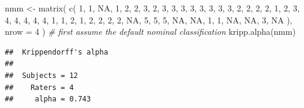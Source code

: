 \documentclass[
]{book}
\newenvironment{Shaded}{\begin{snugshade}}{\end{snugshade}}
\newcommand{\AttributeTok}[1]{\textcolor[rgb]{0.77,0.63,0.00}{#1}}
\newcommand{\CommentTok}[1]{\textcolor[rgb]{0.56,0.35,0.01}{\textit{#1}}}
\newcommand{\ConstantTok}[1]{\textcolor[rgb]{0.00,0.00,0.00}{#1}}
\newcommand{\DecValTok}[1]{\textcolor[rgb]{0.00,0.00,0.81}{#1}}
\newcommand{\FunctionTok}[1]{\textcolor[rgb]{0.00,0.00,0.00}{#1}}
\newcommand{\NormalTok}[1]{#1}
\newcommand{\OtherTok}[1]{\textcolor[rgb]{0.56,0.35,0.01}{#1}}
\begin{document}
\begin{Shaded}
\begin{Highlighting}[]
\NormalTok{nmm }\OtherTok{\textless{}{-}}
    \FunctionTok{matrix}\NormalTok{(}
        \FunctionTok{c}\NormalTok{(}
            \DecValTok{1}\NormalTok{,}
            \DecValTok{1}\NormalTok{,}
            \ConstantTok{NA}\NormalTok{,}
            \DecValTok{1}\NormalTok{,}
            \DecValTok{2}\NormalTok{,}
            \DecValTok{2}\NormalTok{,}
            \DecValTok{3}\NormalTok{,}
            \DecValTok{2}\NormalTok{,}
            \DecValTok{3}\NormalTok{,}
            \DecValTok{3}\NormalTok{,}
            \DecValTok{3}\NormalTok{,}
            \DecValTok{3}\NormalTok{,}
            \DecValTok{3}\NormalTok{,}
            \DecValTok{3}\NormalTok{,}
            \DecValTok{3}\NormalTok{,}
            \DecValTok{3}\NormalTok{,}
            \DecValTok{2}\NormalTok{,}
            \DecValTok{2}\NormalTok{,}
            \DecValTok{2}\NormalTok{,}
            \DecValTok{2}\NormalTok{,}
            \DecValTok{1}\NormalTok{,}
            \DecValTok{2}\NormalTok{,}
            \DecValTok{3}\NormalTok{,}
            \DecValTok{4}\NormalTok{,}
            \DecValTok{4}\NormalTok{,}
            \DecValTok{4}\NormalTok{,}
            \DecValTok{4}\NormalTok{,}
            \DecValTok{4}\NormalTok{,}
            \DecValTok{1}\NormalTok{,}
            \DecValTok{1}\NormalTok{,}
            \DecValTok{2}\NormalTok{,}
            \DecValTok{1}\NormalTok{,}
            \DecValTok{2}\NormalTok{,}
            \DecValTok{2}\NormalTok{,}
            \DecValTok{2}\NormalTok{,}
            \DecValTok{2}\NormalTok{,}
            \ConstantTok{NA}\NormalTok{,}
            \DecValTok{5}\NormalTok{,}
            \DecValTok{5}\NormalTok{,}
            \DecValTok{5}\NormalTok{,}
            \ConstantTok{NA}\NormalTok{,}
            \ConstantTok{NA}\NormalTok{,}
            \DecValTok{1}\NormalTok{,}
            \DecValTok{1}\NormalTok{,}
            \ConstantTok{NA}\NormalTok{,}
            \ConstantTok{NA}\NormalTok{,}
            \DecValTok{3}\NormalTok{,}
            \ConstantTok{NA}
\NormalTok{        ),}
\AttributeTok{nrow =} \DecValTok{4}
\NormalTok{)}
 \CommentTok{\# first assume the default nominal classification}
 \FunctionTok{kripp.alpha}\NormalTok{(nmm)}
\end{Highlighting}
\end{Shaded}

\begin{verbatim}
##  Krippendorff's alpha
## 
##  Subjects = 12 
##    Raters = 4 
##     alpha = 0.743
\end{verbatim}
\end{document}
